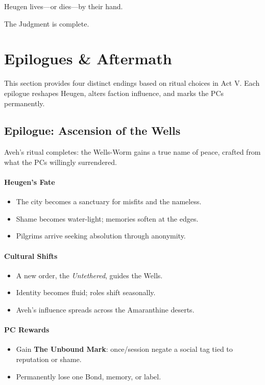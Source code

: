 \documentclass[11pt]{book}
\begin{document}
Heugen lives---or dies---by their hand.

The Judgment is complete.

\section{Epilogues \& Aftermath}

This section provides four distinct endings based on ritual choices in
Act V. Each epilogue reshapes Heugen, alters faction influence, and
marks the PCs permanently.

\subsection{Epilogue: Ascension of the Wells}

Aveh's ritual completes: the Wells-Worm gains a true name of peace,
crafted from what the PCs willingly surrendered.

\paragraph{Heugen's Fate}
\begin{itemize}[leftmargin=*]
    \item The city becomes a sanctuary for misfits and the nameless.
    \item Shame becomes water-light; memories soften at the edges.
    \item Pilgrims arrive seeking absolution through anonymity.
\end{itemize}

\paragraph{Cultural Shifts}
\begin{itemize}[leftmargin=*]
    \item A new order, the \emph{Untethered}, guides the Wells.
    \item Identity becomes fluid; roles shift seasonally.
    \item Aveh's influence spreads across the Amaranthine deserts.
\end{itemize}

\paragraph{PC Rewards}
\begin{itemize}[leftmargin=*]
    \item Gain \textbf{The Unbound Mark}: once/session negate a social tag tied to reputation or shame.
    \item Permanently lose one Bond, memory, or label.
\end{itemize}
\end{document}
